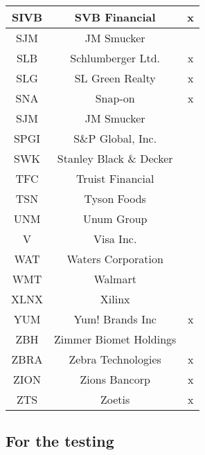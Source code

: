\documentclass[11pt]{article}
\begin{document}
\begin{onehalfspace}
\begin{longtable}[h!]{|c|c|c|}
        SIVB & SVB Financial & x \\ \hline
        SJM & JM Smucker &  \\ \hline
        SLB & Schlumberger Ltd. & x \\ \hline
        SLG & SL Green Realty & x \\ \hline
        SNA & Snap-on & x \\ \hline
        SJM & JM Smucker &  \\ \hline
        SPGI & S\&P Global, Inc. &  \\ \hline
        SWK & Stanley Black \& Decker &  \\ \hline
        TFC & Truist Financial &  \\ \hline
        TSN & Tyson Foods &  \\ \hline
        UNM & Unum Group &  \\ \hline
        V & Visa Inc. &  \\ \hline
        WAT & Waters Corporation &  \\ \hline
        WMT & Walmart &  \\ \hline
        XLNX & Xilinx &  \\ \hline
        YUM & Yum! Brands Inc & x \\ \hline
        ZBH & Zimmer Biomet Holdings &  \\ \hline
        ZBRA & Zebra Technologies & x \\ \hline
        ZION & Zions Bancorp & x \\ \hline
        ZTS & Zoetis & x \\ \hline 
\end{longtable}


\subsection{For the testing}


\end{onehalfspace}
\end{document}

